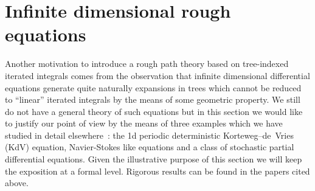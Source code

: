 \documentclass[a4paper,11pt,reqno]{article}
\newcommand{\1}{{\bf 1}}
\begin{document}
\section{Infinite dimensional rough equations}
\label{sec:inf-dim}
Another motivation to introduce a rough path theory based on tree-indexed
iterated integrals comes from the observation that infinite
dimensional differential equations generate quite naturally expansions
in trees which cannot be reduced to ``linear'' iterated integrals by
the means of some geometric property. We still do not have a general
theory of such equations but in this section we would like to justify
our point of view by the means of three examples which we have studied
in detail elsewhere~\cite{kdv,MR2227041,TindelGubinelli}: the 1d periodic
deterministic Korteweg--de~Vries (KdV)  equation, Navier-Stokes like equations and a class of stochastic partial
differential equations. Given the illustrative purpose of this section
we will keep the exposition at a formal level. Rigorous results can be found in the papers cited above.
\end{document}
